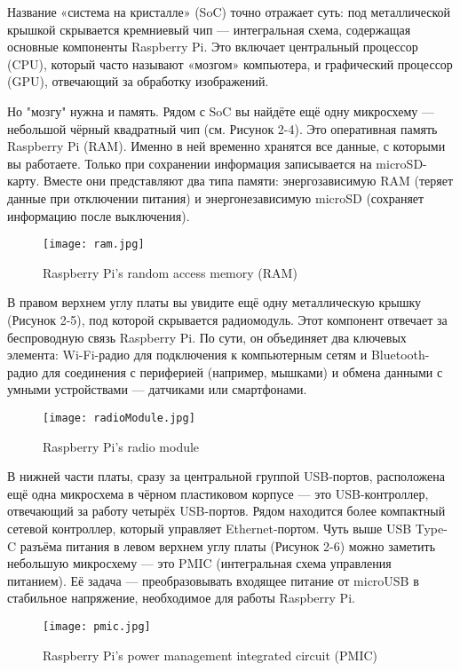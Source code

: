 Название «система на кристалле» (SoC) точно отражает суть: под металлической крышкой скрывается кремниевый чип — интегральная схема, содержащая основные компоненты Raspberry Pi. Это включает центральный процессор (CPU), который часто называют «мозгом» компьютера, и графический процессор (GPU), отвечающий за обработку изображений.

Но "мозгу" нужна и память. Рядом с SoC вы найдёте ещё одну микросхему — небольшой чёрный квадратный чип (см. Рисунок 2-4). Это оперативная память Raspberry Pi (RAM). Именно в ней временно хранятся все данные, с которыми вы работаете. Только при сохранении информация записывается на microSD-карту. Вместе они представляют два типа памяти: энергозависимую RAM (теряет данные при отключении питания) и энергонезависимую microSD (сохраняет информацию после выключения).

\begin{figure}[H]
	\centering
	\texttt{[image: ram.jpg]}
	\caption{Raspberry Pi’s random access memory (RAM)}
\end{figure}

В правом верхнем углу платы вы увидите ещё одну металлическую крышку (Рисунок 2-5), под которой скрывается радиомодуль. Этот компонент отвечает за беспроводную связь Raspberry Pi. По сути, он объединяет два ключевых элемента: Wi-Fi-радио для подключения к компьютерным сетям и Bluetooth-радио для соединения с периферией (например, мышками) и обмена данными с умными устройствами — датчиками или смартфонами.

\begin{figure}[H]
	\centering
	\texttt{[image: radioModule.jpg]}
	\caption{Raspberry Pi’s radio module}
\end{figure}

В нижней части платы, сразу за центральной группой USB-портов, расположена ещё одна микросхема в чёрном пластиковом корпусе — это USB-контроллер, отвечающий за работу четырёх USB-портов. Рядом находится более компактный сетевой контроллер, который управляет Ethernet-портом. Чуть выше USB Type-C разъёма питания в левом верхнем углу платы (Рисунок 2-6) можно заметить небольшую микросхему — это PMIC (интегральная схема управления питанием). Её задача — преобразовывать входящее питание от microUSB в стабильное напряжение, необходимое для работы Raspberry Pi.

\begin{figure}[H]
	\centering
	\texttt{[image: pmic.jpg]}
	\caption{Raspberry Pi’s power management integrated circuit (PMIC)}
\end{figure}


